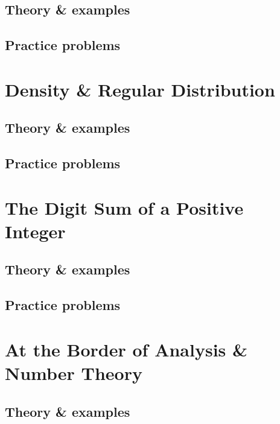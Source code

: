\documentclass[oneside]{book}
\numberwithin{equation}{section}
\begin{document}
\subsection{Theory \& examples}

\subsection{Practice problems}


\section{Density \& Regular Distribution}

\subsection{Theory \& examples}

\subsection{Practice problems}


\section{The Digit Sum of a Positive Integer}

\subsection{Theory \& examples}

\subsection{Practice problems}


\section{At the Border of Analysis \& Number Theory}

\subsection{Theory \& examples}
\end{document}
